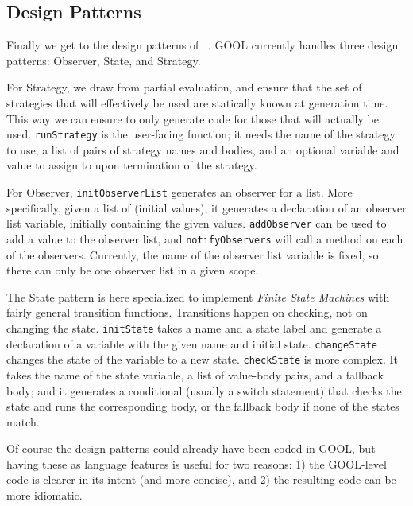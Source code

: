 \documentclass[sigplan,review,anonymous,prologue,dvipsnames]{acmart}
\begin{document}
\subsection{Design Patterns}
Finally we get to the design patterns of ~\cite{gamma1995design}. GOOL
currently handles three design patterns: Observer,
State, and Strategy. 

For Strategy, we draw from partial evaluation, and ensure that the set of
strategies that will effectively be used are statically known at generation
time.  This way we can ensure to only generate code for those that will
actually be used.  \verb|runStrategy| is the user-facing function; it needs the
name of the strategy to use, a list of pairs of strategy names and bodies, and
an optional variable and value to assign to upon termination of the strategy.

For Observer, \verb|initObserverList| generates an observer for a list.  More
specifically, given a list of (initial values), it generates a declaration of
an observer list variable, initially containing the given values.
\verb|addObserver| can be used to add a value to the observer list, and
\verb|notifyObservers| will call a method on each of the observers. Currently,
the name of the observer list variable is fixed, so there can only be one
observer list in a given scope.

The State pattern is here specialized to implement \emph{Finite State Machines}
with fairly general transition functions.  Transitions happen on checking, not
on changing the state.  \verb|initState| takes a name and a state label and
generate a declaration of a variable with the given name and initial state.
\verb|changeState| changes the state of the variable to a new state.
\verb|checkState| is more complex.  It takes the name of the state variable, a
list of value-body pairs, and a fallback body; and it generates a conditional
(usually a switch statement) that checks the state and runs the corresponding
body, or the fallback body if none of the states match.

Of course the design patterns could already have been coded in GOOL, but
having these as language features is useful for two reasons: 1) the GOOL-level
code is clearer in its intent (and more concise), and 2) the resulting code
can be more idiomatic.
\end{document}
